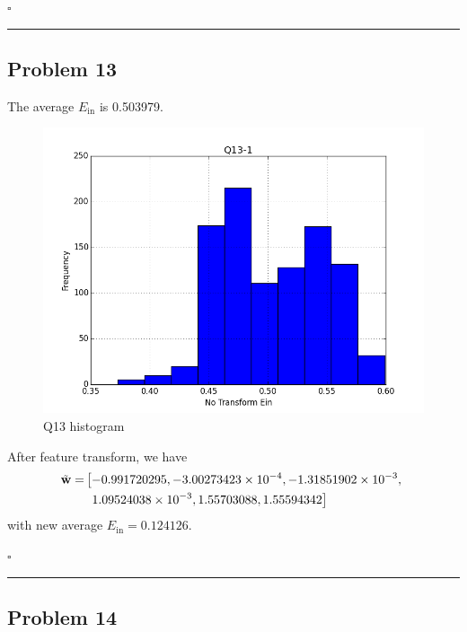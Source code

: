 \documentclass[12pt]{article}
\newcommand*{\QEDB}{\hfill\ensuremath{\square}}
\newcommand{\BF}[1]{{\bf#1}}
\newcommand{\SciNum}[2]{#1\times{10}^{#2}}
\newcommand{\horrule}[1]{\rule{\linewidth}{#1}}
\begin{document}
\QEDB

\horrule{0.5pt}

\subsection*{Problem 13}

The average $E_{\text{in}}$ is 0.503979.
\begin{figure}[h]
	\centering
	\includegraphics[scale=0.3]{Q13-1.png}
	\caption{Q13 histogram}
	\label{Q13}
\end{figure}

After feature transform, we have
\begin{align}
\tilde{\BF{w}}=&\left[-0.991720295,\SciNum{-3.00273423}{-4},\SciNum{-1.31851902}{-3},\right.\\
\nonumber
&~\left.\SciNum{1.09524038}{-3},1.55703088,1.55594342\right]
\end{align}
with new average $E_{\text{in}}=0.124126$.

\QEDB

\horrule{0.5pt}

\subsection*{Problem 14}
\end{document}
